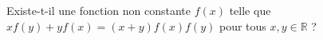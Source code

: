 Existe-t-il une fonction non constante $f(x)$ telle que $xf(y) + yf(x) = (x + y)f(x)f(y)$ pour tous $x, y \in \mathbb{R}$ ?
